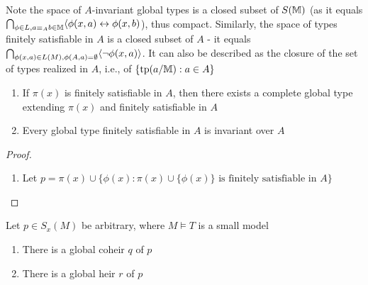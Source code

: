 \documentclass[11pt]{article}
\begin{document}
\begin{remark}
Note the space of \(A\)-invariant global types is a closed subset of \(S(\mathbb{M})\) (as it
equals \(\bigcap_{\phi\in L,a\equiv_Ab\in\mathbb{M}}\langle\phi(x,a)\leftrightarrow\phi(x,b)\)), thus compact. Similarly, the space of types finitely
satisfiable in \(A\) is a closed subset of \(A\) - it
equals \(\bigcap_{\phi(x,a)\in L(M),\phi(A,a)=\emptyset}\langle\neg\phi(x,a)\rangle\). It can also be described as the closure of the
set of types realized in \(A\), i.e., of \(\{\operatorname{tp}(a/\mathbb{M}):a\in A\}\)
\end{remark}

\begin{exercise}
\begin{enumerate}
\item If \(\pi(x)\) is finitely satisfiable in \(A\), then there exists a complete global type
extending \(\pi(x)\) and finitely satisfiable in \(A\)
\item Every global type finitely satisfiable in \(A\) is invariant over \(A\)
\end{enumerate}
\end{exercise}

\begin{proof}
\begin{enumerate}
\item Let \(p=\pi(x)\cup\{\phi(x):\pi(x)\cup\{\phi(x)\}\text{ is finitely satisfiable in }A\}\)
\end{enumerate}
\end{proof}

\begin{proposition}[]
\label{C3.3.7}
Let \(p\in S_x(M)\) be arbitrary, where \(M\vDash T\) is a small model
\begin{enumerate}
\item There is a global coheir \(q\) of \(p\)
\item There is a global heir \(r\) of \(p\)
\end{enumerate}
\end{proposition}
\end{document}
